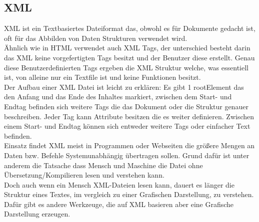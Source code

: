\subsection{XML}
XML ist ein Textbasiertes Dateiformat das, obwohl es für Dokumente gedacht ist, oft für das Abbilden von Daten Strukturen verwendet wird.
\\
Ähnlich wie in HTML verwendet auch XML Tags, der unterschied besteht darin das XML keine vorgefertigten Tags besitzt und der Benutzer diese erstellt. Genau diese Benutzerdefinierten Tags ergeben die XML Struktur welche, was essentiell ist, von alleine nur ein Textfile ist und keine Funktionen besitzt.
\\

Der Aufbau einer XML Datei ist leicht zu erklären: Es gibt 1 rootElement das den Anfang und das Ende des Inhaltes markiert, zwischen dem Start- und Endtag befinden sich weitere Tags die das Dokument oder die Struktur genauer beschreiben. Jeder Tag kann Attribute besitzen die es weiter definieren. Zwischen einem Start- und Endtag können sich entweder weitere Tags oder einfacher Text befinden.
\\
Einsatz findet XML meist in Programmen oder Webseiten die größere Mengen an Daten bzw. Befehle Systemunabhängig übertragen sollen. Grund dafür ist unter anderem die Tatsache dass Mensch und Maschine die Datei ohne Übersetzung/Kompilieren lesen und verstehen kann.\\
Doch auch wenn ein Mensch XML-Dateien lesen kann, dauert es länger die Struktur eines Textes, im vergleich zu einer Grafischen Darstellung, zu verstehen.\\ 
Dafür gibt es andere Werkzeuge, die auf XML basieren aber eine Grafische Darstellung erzeugen.
